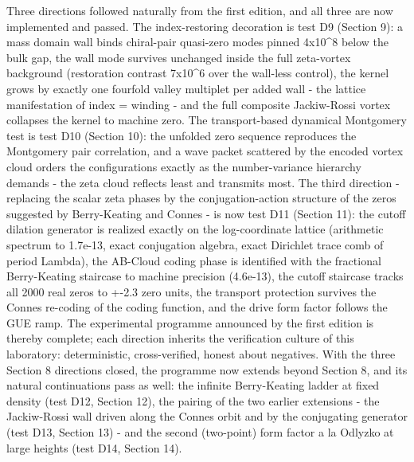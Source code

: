 \documentclass[11pt,a4paper]{article}
\begin{document}
Three directions followed naturally from the first edition, and all three are now implemented and passed. The index-restoring decoration is test D9 (Section 9): a mass domain wall binds chiral-pair quasi-zero modes pinned 4x10\^{}8 below the bulk gap, the wall mode survives unchanged inside the full zeta-vortex background (restoration contrast 7x10\^{}6 over the wall-less control), the kernel grows by exactly one fourfold valley multiplet per added wall - the lattice manifestation of index = winding - and the full composite Jackiw-Rossi vortex collapses the kernel to machine zero. The transport-based dynamical Montgomery test is test D10 (Section 10): the unfolded zero sequence reproduces the Montgomery pair correlation, and a wave packet scattered by the encoded vortex cloud orders the configurations exactly as the number-variance hierarchy demands - the zeta cloud reflects least and transmits most. The third direction - replacing the scalar zeta phases by the conjugation-action structure of the zeros suggested by Berry-Keating and Connes - is now test D11 (Section 11): the cutoff dilation generator is realized exactly on the log-coordinate lattice (arithmetic spectrum to 1.7e-13, exact conjugation algebra, exact Dirichlet trace comb of period Lambda), the AB-Cloud coding phase is identified with the fractional Berry-Keating staircase to machine precision (4.6e-13), the cutoff staircase tracks all 2000 real zeros to +-2.3 zero units, the transport protection survives the Connes re-coding of the coding function, and the drive form factor follows the GUE ramp. The experimental programme announced by the first edition is thereby complete; each direction inherits the verification culture of this laboratory: deterministic, cross-verified, honest about negatives. With the three Section 8 directions closed, the programme now extends beyond Section 8, and its natural continuations pass as well: the infinite Berry-Keating ladder at fixed density (test D12, Section 12), the pairing of the two earlier extensions - the Jackiw-Rossi wall driven along the Connes orbit and by the conjugating generator (test D13, Section 13) - and the second (two-point) form factor a la Odlyzko at large heights (test D14, Section 14).
\end{document}
